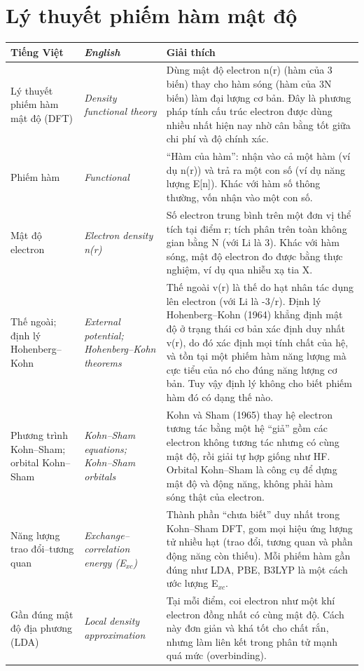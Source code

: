 \section*{Lý thuyết phiếm hàm mật độ}
\begin{longtable}{@{}>{\raggedright\arraybackslash}p{}>{\raggedright\arraybackslash\itshape}p{}>{\raggedright\arraybackslash}p{}@{}}
\toprule \textbf{Tiếng Việt} & \textbf{\upshape English} & \textbf{Giải thích} \\ \midrule \endhead
Lý thuyết phiếm hàm mật độ (DFT) & Density functional theory & Dùng mật độ electron n(r) (hàm của 3 biến) thay cho hàm sóng (hàm của 3N biến) làm đại lượng cơ bản. Đây là phương pháp tính cấu trúc electron được dùng nhiều nhất hiện nay nhờ cân bằng tốt giữa chi phí và độ chính xác. \\[2pt]
Phiếm hàm & Functional & ``Hàm của hàm'': nhận vào cả một hàm (ví dụ n(r)) và trả ra một con số (ví dụ năng lượng E[n]). Khác với hàm số thông thường, vốn nhận vào một con số. \\[2pt]
Mật độ electron & Electron density n(r) & Số electron trung bình trên một đơn vị thể tích tại điểm r; tích phân trên toàn không gian bằng N (với Li là 3). Khác với hàm sóng, mật độ electron đo được bằng thực nghiệm, ví dụ qua nhiễu xạ tia X. \\[2pt]
Thế ngoài; định lý Hohenberg–Kohn & External potential; Hohenberg–Kohn theorems & Thế ngoài v(r) là thế do hạt nhân tác dụng lên electron (với Li là -3/r). Định lý Hohenberg–Kohn (1964) khẳng định mật độ ở trạng thái cơ bản xác định duy nhất v(r), do đó xác định mọi tính chất của hệ, và tồn tại một phiếm hàm năng lượng mà cực tiểu của nó cho đúng năng lượng cơ bản. Tuy vậy định lý không cho biết phiếm hàm đó có dạng thế nào. \\[2pt]
Phương trình Kohn–Sham; orbital Kohn–Sham & Kohn–Sham equations; Kohn–Sham orbitals & Kohn và Sham (1965) thay hệ electron tương tác bằng một hệ ``giả'' gồm các electron không tương tác nhưng có cùng mật độ, rồi giải tự hợp giống như HF. Orbital Kohn–Sham là công cụ để dựng mật độ và động năng, không phải hàm sóng thật của electron. \\[2pt]
Năng lượng trao đổi–tương quan & Exchange–correlation energy (E$_{xc}$) & Thành phần ``chưa biết'' duy nhất trong Kohn–Sham DFT, gom mọi hiệu ứng lượng tử nhiều hạt (trao đổi, tương quan và phần động năng còn thiếu). Mỗi phiếm hàm gần đúng như LDA, PBE, B3LYP là một cách ước lượng E$_{xc}$. \\[2pt]
Gần đúng mật độ địa phương (LDA) & Local density approximation & Tại mỗi điểm, coi electron như một khí electron đồng nhất có cùng mật độ. Cách này đơn giản và khá tốt cho chất rắn, nhưng làm liên kết trong phân tử mạnh quá mức (overbinding). \\[2pt]

\end{longtable}

